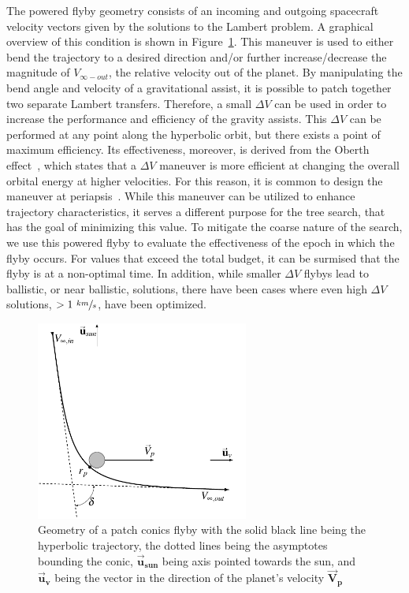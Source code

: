 \documentclass[letterpaper, preprint, paper,11pt]{AAS}	%
\begin{document}
The powered flyby geometry consists of an incoming and outgoing spacecraft velocity vectors given by the solutions to the Lambert problem. A graphical overview of this condition is shown in Figure~\ref*{fig:flyby}. This maneuver is used to either bend the trajectory to a desired direction and/or further increase/decrease the magnitude of $V_{\infty-out}$, the relative velocity out of the planet. By manipulating the bend angle and velocity of a gravitational assist, it is possible to patch together two separate Lambert transfers. Therefore, a small $\Delta V$ can be used in order to increase the performance and efficiency of the gravity assists. This $\Delta V$ can be performed at any point along the hyperbolic orbit, but there exists a point of maximum efficiency. Its effectiveness, moreover, is derived from the Oberth effect~\cite{Adams2010}, which states that a $\Delta V$ maneuver is more efficient at changing the overall orbital energy at higher velocities. For this reason, it is common to design the maneuver at periapsis~\cite{Brennan2015}. While this maneuver can be utilized to enhance trajectory characteristics, it serves a different purpose for the tree search, that has the goal of minimizing this value. To mitigate the coarse nature of the search, we use this powered flyby to evaluate the effectiveness of the epoch in which the flyby occurs. For values that exceed the total budget, it can be surmised that the flyby is at a non-optimal time. In addition, while smaller $\Delta V$ flybys lead to ballistic, or near ballistic, solutions, there have been cases where even high $\Delta V$ solutions, $> 1 \text{ } \sfrac{km}{s}$, have been optimized.

\begin{figure}[htb]
    \centering
    \includegraphics[width=2.75in]{fig/flybyGeo.png}
    \setlength{\belowcaptionskip}{-15pt}
    \caption{Geometry of a patch conics flyby with the solid black line being the hyperbolic trajectory, the dotted lines being the asymptotes bounding the conic, $\boldsymbol{\vec{u}_{sun}}$ being axis pointed towards the sun, and $\boldsymbol{\vec{u}_{v}}$ being the vector in the direction of the planet's velocity $\boldsymbol{\vec{V}_{p}}$}
    \label{fig:flyby}
\end{figure}
\end{document}
